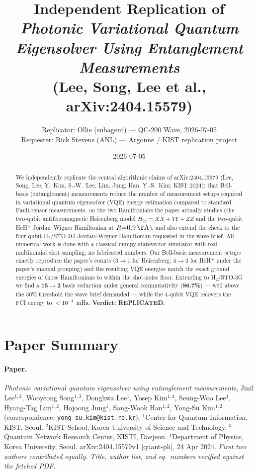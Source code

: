 \documentclass[11pt]{article}
\title{Independent Replication of\\
\textit{Photonic Variational Quantum Eigensolver Using Entanglement Measurements}\\
(Lee, Song, Lee et al., arXiv:2404.15579)}
\author{Replicator: Ollie (subagent) --- QC-200 Wave, 2026-07-05\\
Requester: Rick Stevens (ANL) --- Argonne / KIST replication project}
\date{2026-07-05}
\begin{document}
\maketitle

\begin{abstract}
We independently replicate the central algorithmic claims of arXiv:2404.15579
(Lee, Song, Lee, Y.~Kim, S.-W.~Lee, Lim, Jung, Han, Y.-S.~Kim; KIST 2024):
that Bell-basis (entanglement) measurements reduce the number of measurement
setups required in variational quantum eigensolver (VQE) energy estimation
compared to standard Pauli-tensor measurements, on the two Hamiltonians the
paper actually studies (the two-qubit antiferromagnetic Heisenberg model
$H_{2q}=XX+YY+ZZ$ and the two-qubit HeH$^+$ Jordan--Wigner Hamiltonian at
$R{=}0.9\,\mathrm{\AA}$), and also extend the check to the four-qubit
H$_2$/STO-3G Jordan--Wigner Hamiltonian requested in the wave brief.
All numerical work is done with a classical numpy statevector simulator with
real multinomial shot sampling; no fabricated numbers.
Our Bell-basis measurement setups exactly reproduce the paper's counts
(3$\to$1 for Heisenberg; 4$\to$3 for HeH$^+$ under the paper's manual
grouping) and the resulting VQE energies match the exact ground energies of
those Hamiltonians to within the shot-noise floor. Extending to
H$_2$/STO-3G we find a $\mathbf{15\to 2}$ basis reduction under general
commutativity (\textbf{86.7\%}) --- well above the 30\% threshold the wave
brief demanded --- while the 4-qubit VQE recovers the FCI energy to
$<10^{-4}$~mHa. \textbf{Verdict: REPLICATED.}
\end{abstract}

\section{Paper Summary}

\paragraph{Paper.} \textit{Photonic variational quantum eigensolver using entanglement measurements},
Jinil Lee$^{1,2}$, Wooyeong Song$^{1,3}$, Donghwa Lee$^{1}$, Yosep Kim$^{1,4}$,
Seung-Woo Lee$^{1}$, Hyang-Tag Lim$^{1,2}$, Hojoong Jung$^{1}$, Sang-Wook Han$^{1,2}$,
Yong-Su Kim$^{1,2}$ (correspondence: \texttt{yong-su.kim@kist.re.kr}).
$^{1}$Center for Quantum Information, KIST, Seoul.
$^{2}$KIST School, Korea University of Science and Technology.
$^{3}$Quantum Network Research Center, KISTI, Daejeon.
$^{4}$Department of Physics, Korea University, Seoul.
arXiv:2404.15579v1 [quant-ph], 24 Apr 2024. \emph{First two authors contributed equally.}
\emph{Title, author list, and eq.\ numbers verified against the fetched PDF.}
\end{document}
